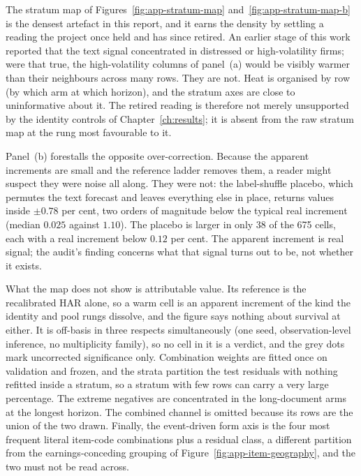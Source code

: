 The stratum map of Figures~\ref{fig:app-stratum-map} and~\ref{fig:app-stratum-map-b} is the densest artefact in this report, and
it earns the density by settling a reading the project once held and has since
retired. An earlier stage of this work reported that the text signal
concentrated in distressed or high-volatility firms; were that true, the
high-volatility columns of panel~(a) would be visibly warmer than their
neighbours across many rows. They are not. Heat is organised by row (by
which arm at which horizon), and the stratum axes are close to uninformative
about it. The retired reading is therefore not merely unsupported by the
identity controls of Chapter~\ref{ch:results}; it is absent from the raw
stratum map at the rung most favourable to it.

Panel~(b) forestalls the opposite over-correction. Because the apparent
increments are small and the reference ladder removes them, a reader might
suspect they were noise all along. They were not: the label-shuffle placebo,
which permutes the text forecast and leaves everything else in place, returns
values inside $\pm0.78$ per cent, two orders of magnitude below the typical
real increment (median $0.025$ against $1.10$). The placebo is larger in only
38 of the 675 cells, each with a real increment below $0.12$ per cent. %
The apparent increment is real signal; the audit's
finding concerns what that signal turns out to be, not whether it exists.

What the map does not show is attributable value. Its reference is the
recalibrated HAR alone, so a warm cell is an apparent increment of the kind
the identity and pool rungs dissolve, and the figure says nothing about
survival at either. It is off-basis in three respects simultaneously (one
seed, observation-level inference, no multiplicity family), so no cell in it
is a verdict, and the grey dots mark uncorrected significance only.
Combination weights are fitted once on validation and frozen, and the strata
partition the test residuals with nothing refitted inside a stratum, so a
stratum with few rows can carry a very large percentage. The extreme negatives
are concentrated in the long-document arms at the longest horizon. The
combined channel is omitted because its rows are the union of the two drawn.
Finally, the event-driven form axis is the four most frequent literal
item-code combinations plus a residual class, a different partition from the
earnings-conceding grouping of Figure~\ref{fig:app-item-geography}, and the
two must not be read across.

